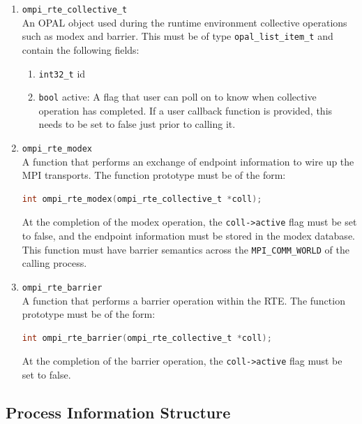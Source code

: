 \begin{enumerate}
\item \verb|ompi_rte_collective_t|\\
  An OPAL object used during the runtime environment collective operations such as modex and barrier. This must be of type \verb|opal_list_item_t| and contain the following fields:
  
  \begin{enumerate}
  \item \verb|int32_t| id
  \item \verb|bool| active: A flag that user can poll on to know when collective operation has completed. If a user callback function is provided, this needs to be set to false just prior to calling it.
  \end{enumerate}

\item \verb|ompi_rte_modex|\\
  A function that performs an exchange of endpoint information to wire up the MPI transports. The function prototype must be of the form:
  \begin{lstlisting}[language=C]
  int ompi_rte_modex(ompi_rte_collective_t *coll);
  \end{lstlisting}
  At the completion of the modex operation, the \verb|coll->active| flag must be set to false, and the endpoint information must be stored in the modex database.
  This function must have barrier semantics across the \verb|MPI_COMM_WORLD| of the calling process.

\item \verb|ompi_rte_barrier|\\
  A function that performs a barrier operation within the RTE. The function prototype must be of the form:
  \begin{lstlisting}[language=C]
  int ompi_rte_barrier(ompi_rte_collective_t *coll);
  \end{lstlisting}
  At the completion of the barrier operation, the \verb|coll->active| flag must be set to false.
\end{enumerate}


\subsection{Process Information Structure}


